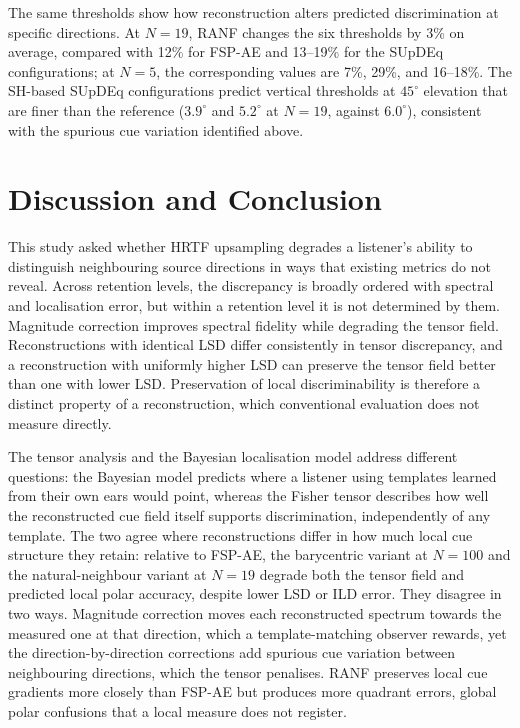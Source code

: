 \documentclass[journal]{IEEEtran}
\begin{document}
The same thresholds show how reconstruction alters predicted discrimination at specific directions. At \(N=19\), RANF changes the six thresholds by 3\% on average, compared with 12\% for FSP-AE and 13--19\% for the SUpDEq configurations; at \(N=5\), the corresponding values are 7\%, 29\%, and 16--18\%. The SH-based SUpDEq configurations predict vertical thresholds at \(45^\circ\) elevation that are finer than the reference (\(3.9^\circ\) and \(5.2^\circ\) at \(N=19\), against \(6.0^\circ\)), consistent with the spurious cue variation identified above.
\section{Discussion and Conclusion}\label{sec:discussion}

This study asked whether HRTF upsampling degrades a listener's ability to distinguish neighbouring source directions in ways that existing metrics do not reveal. Across retention levels, the discrepancy is broadly ordered with spectral and localisation error, but within a retention level it is not determined by them. Magnitude correction improves spectral fidelity while degrading the tensor field. Reconstructions with identical LSD differ consistently in tensor discrepancy, and a reconstruction with uniformly higher LSD can preserve the tensor field better than one with lower LSD. Preservation of local discriminability is therefore a distinct property of a reconstruction, which conventional evaluation does not measure directly.

The tensor analysis and the Bayesian localisation model address different questions: the Bayesian model predicts where a listener using templates learned from their own ears would point, whereas the Fisher tensor describes how well the reconstructed cue field itself supports discrimination, independently of any template. The two agree where reconstructions differ in how much local cue structure they retain: relative to FSP-AE, the barycentric variant at \(N=100\) and the natural-neighbour variant at \(N=19\) degrade both the tensor field and predicted local polar accuracy, despite lower LSD or ILD error. They disagree in two ways. Magnitude correction moves each reconstructed spectrum towards the measured one at that direction, which a template-matching observer rewards, yet the direction-by-direction corrections add spurious cue variation between neighbouring directions, which the tensor penalises. RANF preserves local cue gradients more closely than FSP-AE but produces more quadrant errors, global polar confusions that a local measure does not register.
\end{document}

